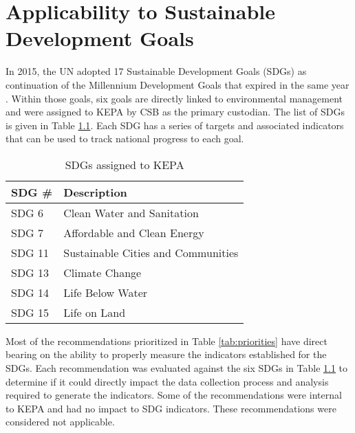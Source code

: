 \chapter{Applicability to Sustainable Development Goals}

\begin{flushleft}
In 2015, the UN adopted 17 Sustainable Development Goals (SDGs) as continuation of the Millennium Development Goals that expired in the same year \citep{SDG2015}. Within those goals, six goals are directly linked to environmental management and were assigned to KEPA by CSB as the primary custodian. The list of SDGs is given in Table \ref{tab:SDG}. Each SDG has a series of targets and associated indicators that can be used to track national progress to each goal.
\end{flushleft}

\begin{table}[H]
\centering
\caption{SDGs assigned to KEPA}
\label{tab:SDG}
\begin{tabular}{@{}ll@{}}
\toprule
\textbf{SDG \#} & \textbf{Description}               \\ \midrule
SDG 6           & Clean Water and Sanitation         \\
SDG 7           & Affordable and Clean Energy        \\
SDG 11          & Sustainable Cities and Communities \\
SDG 13          & Climate Change                     \\
SDG 14          & Life Below Water                   \\
SDG 15          & Life on Land                       \\ \bottomrule
\end{tabular}
\end{table}

\begin{flushleft}
Most of the recommendations prioritized in Table \ref{tab:priorities} have direct bearing on the ability to properly measure the indicators established for the SDGs. Each recommendation was evaluated against the six SDGs in Table \ref{tab:SDG} to determine if it could directly impact the data collection process and analysis required to generate the indicators. Some of the recommendations were internal to KEPA and had no impact to SDG indicators. These recommendations were considered not applicable.
\end{flushleft}

